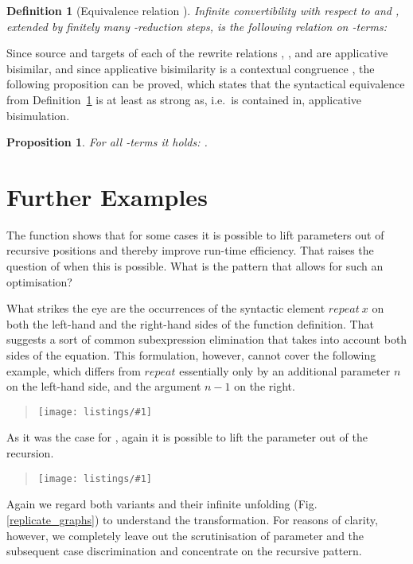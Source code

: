 \documentclass[submission,copyright,creativecommons]{eptcs}
\newtheorem{proposition}[theorem]{Proposition}
\newtheorem{definition}[theorem]{Definition}
\newcommand\listing[1]{\begin{quotation}\noindent\texttt{[image: listings/\#1]}\end{quotation}}
\newcommand\haskell[1]{\ensuremath{\mathit{#1}}}
\newcommand{\nbd}{\nobreakdash}
\newcommand{\nbde}{\nobreakdash-\hspace*{0pt}}
\renewcommand\;{\,}
\begin{document}
\begin{definition}[Equivalence relation ]\normalfont\label{def:opeq}
\emph{Infinite convertibility with respect to}  and , extended by finitely many \nbde{}reduction steps,
  is the following relation on \nbd-terms: 

\end{definition}

Since source and targets of each of the rewrite relations , , and  
are applicative bisimilar, and since applicative bisimilarity is a contextual congruence \cite{abra:1990}, 
the following proposition can be proved, which states that the syntactical equivalence 
from Definition~\ref{def:opeq} is at least as strong as, i.e.\ is contained in, applicative bisimulation. 

\begin{proposition}
For all \nbd-terms  it holds: {} 
    .    
\end{proposition}













\section{Further Examples}\label{sec:examples}


The  function shows that for some cases it is possible to lift
parameters out of recursive positions and thereby improve run-time efficiency.
That raises the question of when this is possible. What is the pattern that
allows for such an optimisation?

What strikes the eye are the occurrences of the syntactic element
\haskell{repeat~x} on both the left-hand and the right-hand sides of the
function definition. That suggests a sort of common subexpression elimination
that takes into account both sides of the equation.
This formulation, however, cannot cover the following example, which differs from \haskell{repeat}
essentially only by an additional parameter \haskell{n} on the left-hand side,
and the argument \haskell{n-1} on the right. \listing{replicate}
As it was the case for , again it is possible to lift the
parameter  out of the recursion. \listing{replicate_eff}
Again we regard both variants and their infinite unfolding (Fig.
\ref{replicate_graphs}) to understand the transformation. For reasons of
clarity, however, we completely leave out the scrutinisation of
parameter  and the subsequent case discrimination and concentrate on the
recursive pattern.
\end{document}
